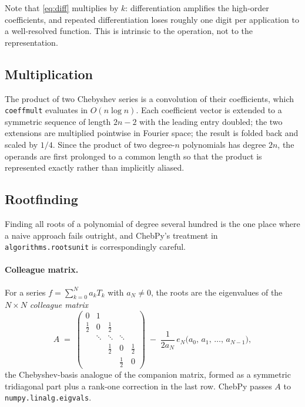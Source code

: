 \documentclass[11pt,a4paper]{article}
\newcommand{\cheb}[1]{T_{#1}}
\newcommand{\code}[1]{\texttt{#1}}
\begin{document}
Note that \eqref{eq:diff} multiplies by $k$: differentiation amplifies the
high-order coefficients, and repeated differentiation loses roughly one digit
per application to a well-resolved function. This is intrinsic to the operation,
not to the representation.

\subsection{Multiplication}

The product of two Chebyshev series is a convolution of their coefficients,
which \code{coeffmult} evaluates in $O(n \log n)$. Each coefficient
vector is extended to a symmetric sequence of length $2n-2$ with the leading
entry doubled; the two extensions are multiplied pointwise in Fourier space;
the result is folded back and scaled by $1/4$. Since the product of two
degree-$n$ polynomials has degree $2n$, the operands are first prolonged to a
common length so that the product is represented exactly rather than
implicitly aliased.

\subsection{Rootfinding}
\label{sec:roots}

Finding all roots of a polynomial of degree several hundred is the one place
where a naive approach fails outright, and ChebPy's treatment in
\code{algorithms.rootsunit} is correspondingly careful.

\paragraph{Colleague matrix.}
For a series $f = \sum_{k=0}^{N} a_k \cheb{k}$ with $a_N \ne 0$, the roots are
the eigenvalues of the $N \times N$ \emph{colleague
matrix}~\cite{good1961,boyd2002}
\begin{equation}
  A \;=\;
  \begin{pmatrix}
    0 & 1 & & & \\
    \tfrac{1}{2} & 0 & \tfrac{1}{2} & & \\
    & \ddots & \ddots & \ddots & \\
    & & \tfrac{1}{2} & 0 & \tfrac{1}{2} \\
    & & & \tfrac{1}{2} & 0
  \end{pmatrix}
  \;-\;
  \frac{1}{2 a_N}\,
  e_N \bigl(a_0,\, a_1,\, \ldots,\, a_{N-1}\bigr),
  \label{eq:colleague}
\end{equation}
the Chebyshev-basis analogue of the companion matrix, formed as a symmetric
tridiagonal part plus a rank-one correction in the last row. ChebPy passes $A$
to \code{numpy.linalg.eigvals}.
\end{document}
